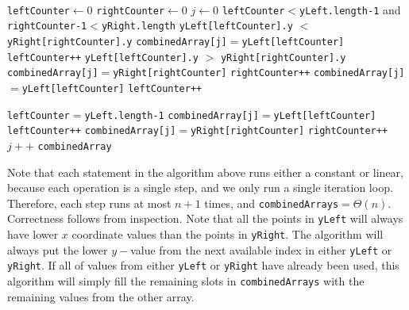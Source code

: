\documentclass[11pt]{article}
\begin{document}
\begin{enumerate}
\begin{enumerate}
\\
\begin{algorithmic}
 
\State \texttt{leftCounter}$ \gets0$ 
\State \texttt{rightCounter}$ \gets0$ 
\State $j \gets 0$
 
	\If \texttt{leftCounter}$<$\texttt{yLeft.length-1} and \texttt{rightCounter-1}$<$\texttt{yRight.length} 
	\If \texttt{yLeft[leftCounter].y} $<$ \texttt{yRight[rightCounter].y} 
		\State \texttt{combinedArray[j]}$=$\texttt{yLeft[leftCounter]} 
 		\State \texttt{leftCounter++} 
 	\Else
 		\If \texttt{yLeft[leftCounter].y} $>$ \texttt{yRight[rightCounter].y} 
		\State \texttt{combinedArray[j]}$=$\texttt{yRight[rightCounter]} 
		\State \texttt{rightCounter++} 
		\Else {}
			\State \texttt{combinedArray[j]}$=$\texttt{yLeft[leftCounter]}
			\State \texttt{leftCounter++} 
		\EndIf
	\EndIf
	
	\Else {}
		\If \texttt{leftCounter}$=$\texttt{yLeft.length-1}
			\State \texttt{combinedArray[j]}$=$\texttt{yLeft[leftCounter]}
			\State \texttt{leftCounter++} 
		\Else {}
			\State \texttt{combinedArray[j]}$=$\texttt{yRight[rightCounter]}
			\State \texttt{rightCounter++} 
		\EndIf 
	\EndIf
	\State $j++$ 
\EndWhile
\Return \texttt{combinedArray}
\EndProcedure

\end{algorithmic}

Note that each statement in the algorithm above runs either a constant or linear, because each operation is a single step, and we only run a single iteration loop.  Therefore, each step runs at most $n+1$ times, and \texttt{combinedArrays}$= \Theta(n)$.
\\
Correctness follows from inspection.  Note that all the points in \texttt{yLeft} will always have lower $x$ coordinate values than the points in \texttt{yRight}.  The algorithm will always put the lower $y-$value from the next available index in either \texttt{yLeft} or \texttt{yRight}.  If all of values from either \texttt{yLeft} or \texttt{yRight} have already been used, this algorithm will simply fill the remaining slots in \texttt{combinedArrays} with the remaining values from the other array.
\end{enumerate}
\end{enumerate}
\end{document}

